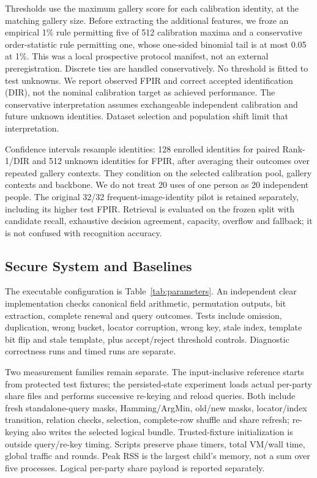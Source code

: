 \documentclass[journal]{IEEEtran}
\begin{document}
Thresholds use the maximum gallery score for each calibration identity, at the matching gallery size. Before extracting the additional features, we froze an empirical 1\% rule permitting five of 512 calibration maxima and a conservative order-statistic rule permitting one, whose one-sided binomial tail is at most 0.05 at 1\%. This was a local prospective protocol manifest, not an external preregistration. Discrete ties are handled conservatively. No threshold is fitted to test unknowns. We report observed FPIR and correct accepted identification (DIR), not the nominal calibration target as achieved performance. The conservative interpretation assumes exchangeable independent calibration and future unknown identities. Dataset selection and population shift limit that interpretation.

Confidence intervals resample identities: 128 enrolled identities for paired Rank-1/DIR and 512 unknown identities for FPIR, after averaging their outcomes over repeated gallery contexts. They condition on the selected calibration pool, gallery contexts and backbone. We do not treat 20 uses of one person as 20 independent people. The original 32/32 frequent-image-identity pilot is retained separately, including its higher test FPIR. Retrieval is evaluated on the frozen split with candidate recall, exhaustive decision agreement, capacity, overflow and fallback; it is not confused with recognition accuracy.

\subsection{Secure System and Baselines}
The executable configuration is Table~\ref{tab:parameters}. An independent clear implementation checks canonical field arithmetic, permutation outputs, bit extraction, complete renewal and query outcomes. Tests include omission, duplication, wrong bucket, locator corruption, wrong key, stale index, template bit flip and stale template, plus accept/reject threshold controls. Diagnostic correctness runs and timed runs are separate.

Two measurement families remain separate. The input-inclusive reference starts from protected test fixtures; the persisted-state experiment loads actual per-party share files and performs successive re-keying and reload queries. Both include fresh standalone-query masks, Hamming/ArgMin, old/new masks, locator/index transition, relation checks, selection, complete-row shuffle and share refresh; re-keying also writes the selected logical bundle. Trusted-fixture initialization is outside query/re-key timing. Scripts preserve phase timers, total VM/wall time, global traffic and rounds. Peak RSS is the largest child's memory, not a sum over five processes. Logical per-party share payload is reported separately.
\end{document}
